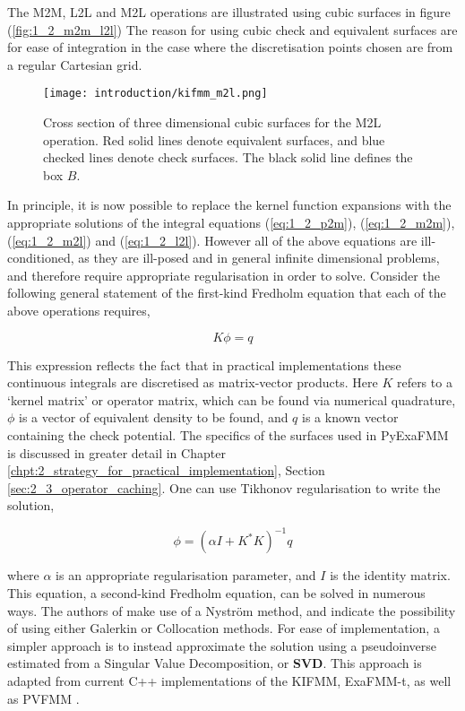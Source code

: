 The \gls{M2M}, \gls{L2L} and \gls{M2L} operations are illustrated using cubic surfaces in figure (\ref{fig:1_2_m2m_l2l})
The reason for using cubic check and equivalent surfaces are for ease of integration
in the case where the discretisation points chosen are from a regular Cartesian
grid.

\begin{figure}[!h]
    \centering
    {\texttt{[image: introduction/kifmm\_m2l.png]}}
    \caption{Cross section of three dimensional cubic surfaces for the \gls{M2L} operation.
    Red solid lines denote equivalent surfaces, and blue checked lines denote check surfaces.
    The black solid line defines the box $B$.}
  \label{fig:1_2_m2l}
\end{figure}

In principle, it is now possible to replace the kernel function expansions with
the appropriate solutions of the integral equations (\ref{eq:1_2_p2m}),
(\ref{eq:1_2_m2m}), (\ref{eq:1_2_m2l}) and (\ref{eq:1_2_l2l}). However all of
the above equations are ill-conditioned, as they are ill-posed and in general infinite
dimensional problems, and therefore require appropriate regularisation in order to solve.
Consider the following general statement of the first-kind Fredholm equation
that each of the above operations requires,

\begin{equation}
K \phi = q
\label{eq:1_2_first_kind_fredholm}
\end{equation}

This expression reflects the fact that in practical implementations these continuous
integrals are discretised as matrix-vector products. Here $K$ refers to a
`kernel matrix' or operator matrix, which can be found via numerical quadrature, $\phi$ is a vector
of equivalent density to be found, and $q$ is a known vector containing the check
potential. The specifics of the surfaces used in PyExaFMM is discussed in
greater detail in Chapter \ref{chpt:2_strategy_for_practical_implementation},
Section \ref{sec:2_3_operator_caching}. One can use Tikhonov regularisation to
write the solution,

\begin{equation}
\phi = (\alpha I + K^*K)^{-1}q
\label{eq:1_2_tikhonov}
\end{equation}

where $\alpha$ is an appropriate regularisation parameter, and $I$ is the identity
matrix. This equation, a second-kind Fredholm equation, can be solved in numerous
ways. The authors of \cite{Ying:2004:JCP} make use of a Nyström method, and indicate
the possibility of using either Galerkin or Collocation methods. For ease of
implementation, a simpler approach is to instead approximate the solution using a pseudoinverse
estimated from a Singular Value Decomposition, or \textbf{\gls{SVD}}. This
approach is adapted from current C++ implementations of the \gls{KIFMM}, ExaFMM-t,
as well as PVFMM \cite{Malhotra:2015:CCP,exafmm}.

